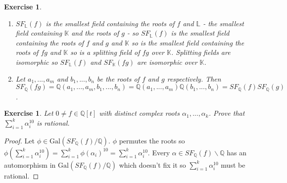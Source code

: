 \documentclass{article}
\newtheorem{exercise}[theorem]{Exercise}
\begin{document}
\begin{exercise}
\begin{enumerate}[label=(\roman*)]
    \item $SF_\mathbb{L}(f)$ is the smallest field containing the roots of $f$ and $\mathbb{L}$ - the smallest field containing $\mathbb{K}$ and the roots of $g$ - so $SF_\mathbb{L}(f)$ is the smallest field containing the roots of $f$ and $g$ and $\mathbb{K}$ so is the smallest field containing the roots of $fg$ and $\mathbb{K}$ so is a splitting field of $fg$ over $\mathbb{K}$. Splitting fields are isomorphic so $SF_\mathbb{L}(f)$ and $SF_\mathbb{K}(fg)$ are isomorphic over $\mathbb{K}$.
    \item Let $a_1,...,a_m$ and $b_1,...,b_n$ be the roots of $f$ and $g$ respectively. Then $SF_\mathbb{Q}(fg)=\mathbb{Q}(a_1,...,a_m,b_1,...,b_n)=\mathbb{Q}(a_1,...,a_m)\mathbb{Q}(b_1,...,b_n)=SF_\mathbb{Q}(f)SF_\mathbb{Q}(g)$.
\end{enumerate}
\end{exercise}

\begin{exercise}
Let $0\neq f\in\mathbb{Q}[t]$ with distinct complex roots $\alpha_1,...,\alpha_k$. Prove that $\sum_{i=1}^k\alpha_i^{10}$ is rational.
\end{exercise}
\begin{proof}
Let $\phi\in\text{Gal}(SF_\mathbb{Q}(f)/\mathbb{Q})$. $\phi$ permutes the roots so $\phi(\sum_{i=1}^k\alpha_i^{10})=\sum_{i=1}^k\phi(\alpha_i)^{10}=\sum_{i=1}^k\alpha_i^{10}$. Every $\alpha\in SF_\mathbb{Q}(f)\backslash\mathbb{Q}$ has an automorphism in $\text{Gal}(SF_\mathbb{Q}(f)/\mathbb{Q})$ which doesn't fix it so $\sum_{i=1}^k\alpha_i^{10}$ must be rational.
\end{proof}
\end{document}
